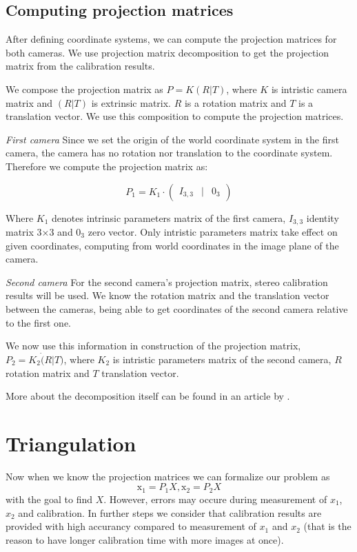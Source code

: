 \subsection{Computing projection matrices}
After defining coordinate systems, we can compute the projection matrices for
both cameras. We use projection matrix decomposition to get the projection matrix
from the calibration results.

We compose the projection matrix as $P = K(R|T)$, where $K$ is intristic
camera matrix and $(R|T)$ is extrinsic matrix. $R$ is a rotation matrix and
$T$ is a translation vector. We use this composition to compute the projection
matrices.

\emph{First camera}
Since we set the origin of the world coordinate system in the first camera,
the camera has no rotation nor translation to the coordinate system. Therefore
we compute the projection matrix as:

\[
 P_1 = K_1 \cdot \begin{pmatrix}
	I_{3, 3} & | & 0_3  
\end{pmatrix}
\]

Where $K_1$ denotes intrinsic parameters matrix of the first camera, $I_{3,3}$ identity
matrix 3$\times$3 and $0_3$ zero vector. Only intristic parameters matrix take
effect on given coordinates, computing from world coordinates in the image plane of the camera.

\emph{Second camera}
For the second camera's projection matrix, stereo calibration results will be
used. We know the rotation matrix and the translation vector between the cameras,
being able to get coordinates of the second camera relative to the first one.

We now use this information in construction of the projection matrix, $P_2 = K_2
\dot (R | T)$, where $K_2$ is intristic parameters matrix of the second camera, $R$
rotation matrix and $T$ translation vector.

More about the decomposition itself can be found in an article by
\citet{computervisionblog}.

\section{Triangulation}
Now when we know the projection matrices we can formalize our problem as
\begin{equation}
\mathrm{x_1} = P_1X, \mathrm{x_2} = P_2X \label{projection-statements}
\end{equation}
with the goal to find $X$. However, errors may occure during
measurement of $x_1$, $x_2$ and calibration. In further steps we consider that
calibration results are provided with high accurancy compared to measurement of
$x_1$ and $x_2$ (that is the reason to have longer calibration time with more images
at once).

